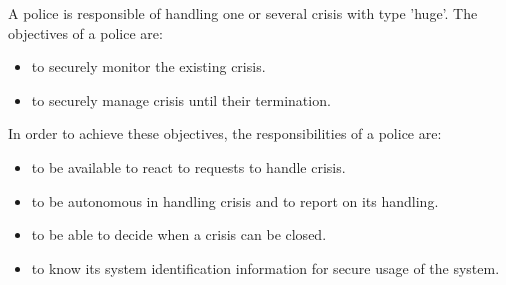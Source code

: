 A police is responsible of handling one or several crisis with type 'huge'. 
The objectives of a police are:
\begin{itemize}
  \item to securely monitor the existing crisis.
  \item to securely manage crisis until their termination.
\end{itemize}
\vspace{0.5cm}

In order to achieve these objectives, the responsibilities of a police are:
\begin{itemize}
  \item to be available to react to requests to handle crisis.
  \item to be autonomous in handling crisis and to report on its handling.
  \item to be able to decide when a crisis can be closed.
  \item to know its system identification information for secure usage of the system.
\end{itemize}

